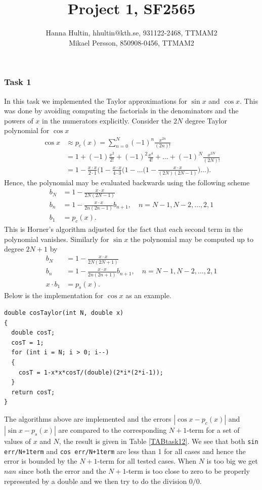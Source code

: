 \documentclass[a4paper,10pt]{article}
\title{Project 1, SF2565}
\author{Hanna Hultin, hhultin@kth.se, 931122-2468, TTMAM2 \\ Mikael Persson, 850908-0456, TTMAM2}
\begin{document}
\maketitle

\subsubsection*{Task 1}
In this task we implemented the Taylor approximations for $\sin x$ and $\cos x$.
This was done by avoiding computing the factorials in the denominators and the powers of $x$ in the numerators explicitly.
Consider the $2N$ degree Taylor polynomial for  $\cos x$
\begin{align*}
  \cos x &\approx p_c(x) = \sum_{n=0}^{N} (-1)^n \frac{x^{2n}}{(2n)!} \\ 
  \quad &= 1 + (-1) \frac{x^2}{2!} + (-1)^2 \frac{x^4}{4!} + \dots + (-1)^N \frac{x^{2N}}{(2N)!}
  \\
  &= 1 - \frac{x\cdot x}{2\cdot 1} \Big(1 - \frac{x \cdot x}{ 4 \cdot 3} \Big( 
  1 - \dots \Big(1- \frac{x \cdot x}{(2N)(2N-1)}\Big)\dots \Big).
\end{align*}
Hence, the polynomial may be evaluated backwards using the following scheme
\begin{align*}
  b_N &= 1-\frac{x \cdot x}{2N(2N-1)} \\
  b_n &= 1-\frac{x\cdot x}{2n(2n-1)}b_{n+1},\quad n = N-1,N-2,\dots,2,1 \\
  b_1 &= p_c(x).
\end{align*}
This is Horner's algorithm adjusted for the fact that each second term in the polynomial vanishes.
Similarly for $\sin x$ the polynomial may be computed up to degree $2N+1$ by
\begin{align*}
  b_N &= 1-\frac{x \cdot x}{2N(2N+1)} \\
  b_n &= 1-\frac{x\cdot x}{2n(2n+1)}b_{n+1},\quad n = N-1,N-2,\dots,2,1 \\
  x\cdot b_1 &= p_s(x).
\end{align*}
Below is the implementation for $\cos x$ as an example.
\begin{center}
\begin{minipage}[t]{85mm}
\begin{lstlisting}
double cosTaylor(int N, double x) 
{
  double cosT;
  cosT = 1;
  for (int i = N; i > 0; i--)
  {
    cosT = 1-x*x*cosT/(double)(2*i*(2*i-1));
  }
  return cosT;
}
\end{lstlisting}
\end{minipage}
\end{center}
The algorithms above are implemented and the errors 
$|\cos x - p_c(x)|$ and $|\sin x - p_s (x)|$ are 
compared to the corresponding $N+1$-term for a set of values of $x$ and $N$, the result is given
in Table \ref{TABtask12}. We see that both \texttt{sin err/N+1term} and \texttt{cos err/N+1term} are less than 1 for all cases and hence the error is bounded by the $N+1$-term for all tested cases. When $N$ is too big we get $nan$ since both the error and the $N+1$-term is too close to zero to be properly represented by a double and we then try to do the division $0/0$.
\end{document}
